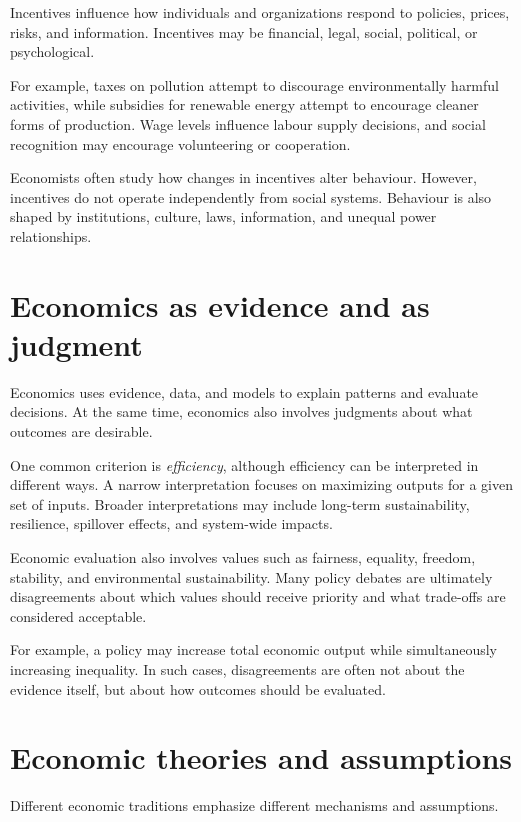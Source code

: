 \documentclass[
  11pt,
  oneside]{book}
\begin{document}
Incentives influence how individuals and organizations respond to policies, prices, risks, and information. Incentives may be financial, legal, social, political, or psychological.

For example, taxes on pollution attempt to discourage environmentally harmful activities, while subsidies for renewable energy attempt to encourage cleaner forms of production. Wage levels influence labour supply decisions, and social recognition may encourage volunteering or cooperation.

Economists often study how changes in incentives alter behaviour. However, incentives do not operate independently from social systems. Behaviour is also shaped by institutions, culture, laws, information, and unequal power relationships.

\section{Economics as evidence and as judgment}\label{economics-as-evidence-and-as-judgment}

Economics uses evidence, data, and models to explain patterns and evaluate decisions. At the same time, economics also involves judgments about what outcomes are desirable.

One common criterion is \emph{efficiency}, although efficiency can be interpreted in different ways. A narrow interpretation focuses on maximizing outputs for a given set of inputs. Broader interpretations may include long-term sustainability, resilience, spillover effects, and system-wide impacts.

Economic evaluation also involves values such as fairness, equality, freedom, stability, and environmental sustainability. Many policy debates are ultimately disagreements about which values should receive priority and what trade-offs are considered acceptable.

For example, a policy may increase total economic output while simultaneously increasing inequality. In such cases, disagreements are often not about the evidence itself, but about how outcomes should be evaluated.

\section{Economic theories and assumptions}\label{economic-theories-and-assumptions}

Different economic traditions emphasize different mechanisms and assumptions.
\end{document}
